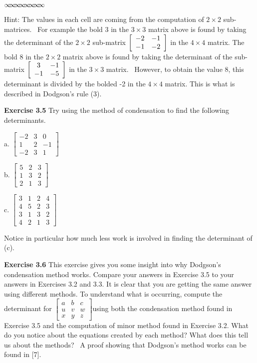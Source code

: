 \documentclass[11pt]{article}%
\theoremstyle{definition}
\newcommand{\sep}{\vspace{-3pt} \begin{center}
{\mathversion{normal}
$\infty \mspace{-5.5mu} \infty \mspace{-5.5mu}
\infty \mspace{-5.5mu} \infty \mspace{-5.5mu}
\infty \mspace{-5.5mu} \infty \mspace{-5.5mu}
\infty \mspace{-5.5mu} \infty$}
\end{center} \vspace{-3pt}}
\begin{document}
%

\sep


Hint: The values in each cell are coming from the computation of $2\times2$
sub-matrices. \ For example the bold 3 in the $3\times3$ matrix above is found
by taking the determinant of the $2\times2$ sub-matrix $\left[
\begin{array}
[c]{cc}%
-2 & -1\\
-1 & -2
\end{array}
\right]  $ in the $4\times4$ matrix$.$ The bold 8 in the $2\times2$ matrix
above is found by taking the determinant of the sub-matrix $\left[
\begin{array}
[c]{cc}%
3 & -1\\
-1 & -5
\end{array}
\right]  $ in the $3\times3$ matrix. \ However, to obtain the value 8, this
determinant is divided by the bolded -2 in the $4\times4$ matrix. This is what
is described in Dodgson's rule (3).

\bigskip

\noindent\textbf{Exercise 3.5} Try using the method of condensation to find
the following determinants.

a. $%
\begin{bmatrix}
-2 & 3 & 0\\
1 & 2 & -1\\
-2 & 3 & 1
\end{bmatrix}
$

b. $%
\begin{bmatrix}
5 & 2 & 3\\
1 & 3 & 2\\
2 & 1 & 3
\end{bmatrix}
$

c. $%
\begin{bmatrix}
3 & 1 & 2 & 4\\
4 & 5 & 2 & 3\\
3 & 1 & 3 & 2\\
4 & 2 & 1 & 3
\end{bmatrix}
$

\bigskip

Notice in particular how much less work is involved in finding the determinant
of (c).

\bigskip

\noindent\textbf{Exercise 3.6} This exercise gives you some insight into why
Dodgson's condensation method works. Compare your answers in Exercise 3.5 to
your answers in Exercises 3.2 and 3.3. It is clear that you are getting the
same answer using different methods. To understand what is occurring, compute
the determinant for $%
\begin{bmatrix}
a & b & c\\
u & v & w\\
x & y & z
\end{bmatrix}
$using both the condensation method found in Exercise 3.5 and the computation
of minor method found in Exercise 3.2. What do you notice about the equations
created by each method? What does this tell us about the methods? \ A proof
showing that Dodgson's method works can be found in [7].
\end{document}
